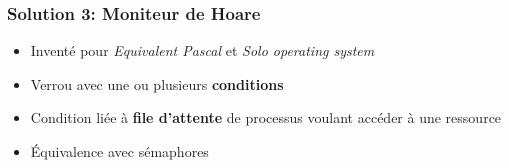 \documentclass{beamer}
\begin{document}
\begin{frame} 
  \frametitle{Solution 3: Moniteur de Hoare}
  \begin{minipage}{.5\linewidth}
    \begin{itemize}
    \item Inventé pour \textit{Equivalent Pascal} et \textit{Solo operating
        system}
    \item Verrou avec une ou plusieurs \textbf{conditions}
    \item Condition liée à \textbf{file d'attente} de processus voulant
      accéder à une ressource
    \item Équivalence avec sémaphores
    \end{itemize}
  \begin{minipage}{.5\linewidth}
  \end{minipage}
  \end{minipage}
\end{frame} %
\end{document}
